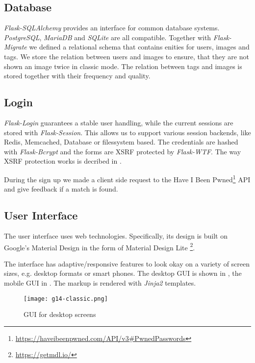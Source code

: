 \subsection{Database}
\label{g14:sec:implementation:database}
\textit{Flask-SQLAlchemy} provides an interface for common database systems. \textit{PostgreSQL}, \textit{MariaDB} and \textit{SQLite} are all compatible.
Together with \textit{Flask-Migrate} we defined a relational schema that contains enities for users, images and tags. We store the relation between users and images to ensure, that they are not shown an image twice in classic mode. The relation between tags and images is stored together with their frequency and quality.

\subsection{Login}
\label{g14:sec:implementation:login}
\textit{Flask-Login} guarantees a stable user handling, while the current sessions are stored with \textit{Flask-Session}. This allows us to support various session backends, like Redis, Memcached, Database or filessystem based. The credentials are hashed with \textit{Flask-Bcrypt} and the forms are XSRF protected by \textit{Flask-WTF}. The way XSRF protection works is decribed in \cite{4198791}.

During the sign up we made a client side request to the Have I Been Pwned\footnote{\url{https://haveibeenpwned.com/API/v3\#PwnedPasswords}} API and give feedback if a match is found.

\subsection{User Interface}
\label{g14:sec:implementation:UI}

The user interface uses web technologies. Specifically, its design is built on Google's Material Design in the form of Material Design Lite \footnote{\url{https://getmdl.io/}}.

The interface has adaptive/responsive features to look okay on a variety of screen sizes, e.g. desktop formats or smart phones. The desktop GUI is shown in , the mobile GUI in .
The markup is rendered with \textit{Jinja2} templates.



\begin{figure}[!]
\centering
\texttt{[image: g14-classic.png]}
\caption{GUI for desktop screens}
\label{g14:fig:guiclassicdesktop}
\end{figure}


